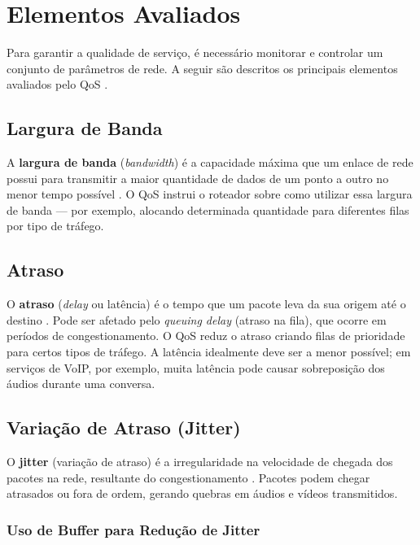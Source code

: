 \section{Elementos Avaliados}

Para garantir a qualidade de serviço, é necessário monitorar e controlar um
conjunto de parâmetros de rede. A seguir são descritos os principais elementos
avaliados pelo QoS \cite{geeksforgeeks2024}.

\subsection{Largura de Banda}

A \textbf{largura de banda} (\textit{bandwidth}) é a capacidade máxima que um
enlace de rede possui para transmitir a maior quantidade de dados de um ponto a
outro no menor tempo possível \cite{fortinet2024}. O QoS instrui o roteador sobre
como utilizar essa largura de banda — por exemplo, alocando determinada
quantidade para diferentes filas por tipo de tráfego.

\subsection{Atraso}

O \textbf{atraso} (\textit{delay} ou latência) é o tempo que um pacote leva da
sua origem até o destino \cite{fortinet2024}. Pode ser afetado pelo
\textit{queuing delay} (atraso na fila), que ocorre em períodos de
congestionamento. O QoS reduz o atraso criando filas de prioridade para certos
tipos de tráfego. A latência idealmente deve ser a menor possível; em serviços de
VoIP, por exemplo, muita latência pode causar sobreposição dos áudios durante uma
conversa.

\subsection{Variação de Atraso (Jitter)}

O \textbf{jitter} (variação de atraso) é a irregularidade na velocidade de
chegada dos pacotes na rede, resultante do congestionamento \cite{fortinet2024}.
Pacotes podem chegar atrasados ou fora de ordem, gerando quebras em áudios e
vídeos transmitidos.

\subsubsection{Uso de Buffer para Redução de Jitter}

